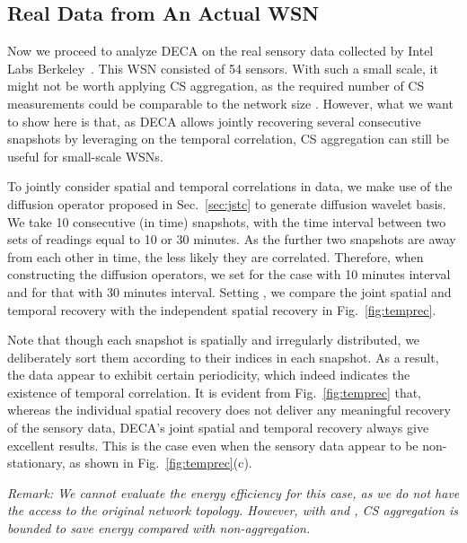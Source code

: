 \documentclass[conference]{IEEEtran}
\begin{document}
  \subsection{Real Data from An Actual WSN} \label{sec:intel}
Now we proceed to analyze DECA on the real sensory data collected by Intel Labs Berkeley~\cite{Intel}. This WSN consisted of 54 sensors. With such a small scale,  it might not be worth applying CS aggregation, as the required number of CS measurements could be comparable to the network size . However, what we want to show here is that, as DECA allows jointly recovering several consecutive snapshots  by leveraging on the temporal correlation, CS aggregation can still be useful for small-scale WSNs.


    To jointly consider spatial and temporal correlations in data, we make use of the diffusion operator proposed in Sec.~\ref{sec:jstc} to generate diffusion wavelet basis. We take 10 consecutive (in time) snapshots, with the time interval between two sets of readings equal to 10 or 30 minutes. As the further two snapshots are away from each other in time, the less likely they are correlated. Therefore, when constructing the diffusion operators, we set  for the case with 10 minutes interval and  for that with 30 minutes interval. Setting , we compare the joint spatial and temporal recovery with the independent spatial recovery in Fig.~\ref{fig:temprec}.


    Note that though each snapshot  is spatially and irregularly distributed, we deliberately sort them according to their indices in each snapshot. As a result, the data appear to exhibit certain periodicity, which indeed indicates the existence of temporal correlation. It is evident from Fig.~\ref{fig:temprec} that, whereas the individual spatial recovery does not deliver any meaningful recovery of the sensory data, DECA's joint spatial and temporal recovery always give excellent results. This is the case even when the sensory data appear to be non-stationary, as shown in Fig.~\ref{fig:temprec}(c).

    \vspace{1ex}\noindent\emph{Remark: We cannot evaluate the energy efficiency for this case, as we do not have the access to the original network topology. However, with  and , CS aggregation is bounded to save energy compared with non-aggregation.}
\end{document}
